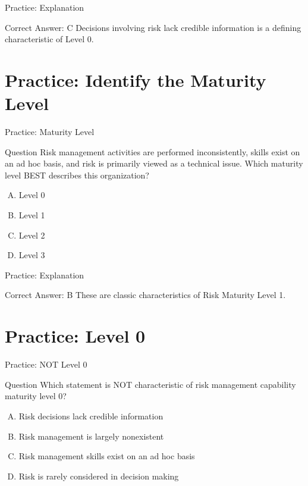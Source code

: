 \documentclass{beamer}
\begin{document}
	\begin{frame}{Practice: Explanation}
		\begin{block}{Correct Answer: C}
			Decisions involving risk lack credible information is a defining characteristic of Level 0.
		\end{block}
	\end{frame}
	

	\section{Practice: Identify the Maturity Level}
	
	\begin{frame}{Practice: Maturity Level}
		\begin{block}{Question}
			Risk management activities are performed inconsistently, skills exist on an ad hoc basis, and risk is primarily viewed as a technical issue. Which maturity level BEST describes this organization?
		\end{block}
		\begin{enumerate}[(A)]
			\item Level 0
			\item Level 1
			\item Level 2
			\item Level 3
		\end{enumerate}
	\end{frame}
	
	\begin{frame}{Practice: Explanation}
		\begin{block}{Correct Answer: B}
			These are classic characteristics of Risk Maturity Level 1.
		\end{block}
	\end{frame}
	

	\section{Practice: Level 0}
	
	\begin{frame}{Practice: NOT Level 0}
		\begin{block}{Question}
			Which statement is NOT characteristic of risk management capability maturity level 0?
		\end{block}
		\begin{enumerate}[(A)]
			\item Risk decisions lack credible information
			\item Risk management is largely nonexistent
			\item Risk management skills exist on an ad hoc basis
			\item Risk is rarely considered in decision making
		\end{enumerate}
	\end{frame}
	
\end{document}
